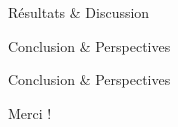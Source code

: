 \documentclass{beamer}
\begin{document}
\begin{frame}{Résultats \& Discussion}
\end{frame}

\begin{frame}{Conclusion \& Perspectives}
\end{frame}

\begin{frame}{Conclusion \& Perspectives}
\end{frame}

\begin{frame}
  \begin{center}
  \Huge{Merci !}
  \end{center}

\end{frame}
\end{document}
